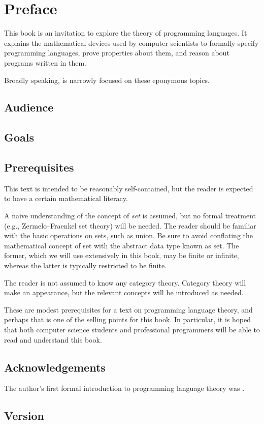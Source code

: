 \chapter{Preface}

  This book is an invitation to explore the theory of programming languages. It explains the mathematical devices used by computer scientists to formally specify programming languages, prove properties about them, and reason about programs written in them.

  Broadly speaking, \emph{\booktitle} is narrowly focused on these eponymous topics.

  \section*{Audience}

  \section*{Goals}

  \section*{Prerequisites}

    This text is intended to be reasonably self-contained, but the reader is expected to have a certain mathematical literacy.

    A naive understanding of the concept of \emph{set} is assumed, but no formal treatment (e.g., Zermelo--Fraenkel set theory) will be needed. The reader should be familiar with the basic operations on sets, such as union. Be sure to avoid conflating the mathematical concept of set with the abstract data type known as set. The former, which we will use extensively in this book, may be finite or infinite, whereas the latter is typically restricted to be finite.

    The reader is not assumed to know any category theory. Category theory will make an appearance, but the relevant concepts will be introduced as needed.

    These are modest prerequisites for a text on programming language theory, and perhaps that is one of the selling points for this book. In particular, it is hoped that both computer science students and professional programmers will be able to read and understand this book.

  \section*{Acknowledgements}

    The author's first formal introduction to programming language theory was \textcite{tapl}.

  \section*{Version}

    
